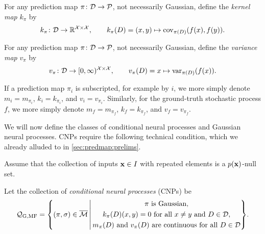 \documentclass[12pt, twoside]{report}
\begin{document}
\begin{definition}
    \label{def:kernel_map}
    For any prediction map $\pi \colon \mathcal{D} \to \mathcal{P}$, not necessarily Gaussian, define the \emph{kernel map} $k_\pi$ by
    \begin{equation}
        k_\pi\colon \mathcal{D} \to \mathbb{R}^{\mathcal{X} \times \mathcal{X}}, \qquad
        k_\pi(D) = (x, y) \mapsto \operatorname{cov}_{\pi(D)}(f(x), f(y)).
    \end{equation}
\end{definition}

\begin{definition}
    \label{def:variance_map}
    For any prediction map $\pi \colon \mathcal{D} \to \mathcal{P}$, not necessarily Gaussian, define the \emph{variance map} $v_\pi$ by
    \begin{equation}
        v_\pi\colon \mathcal{D} \to [0,\infty)^{\mathcal{X} \times \mathcal{X}}, \qquad
        v_\pi(D) = x \mapsto \operatorname{var}_{\pi(D)}(f(x)).
    \end{equation}
\end{definition}

If a prediction map $\pi_i$ is subscripted, for example by $i$, we more simply denote $m_i = m_{\pi_i}$, $k_i = k_{\pi_i}$, and $v_i = v_{\pi_i}$.
Similarly, for the ground-truth stochastic process $f$, we more simply denote $m_f = m_{\pi_f}$, $k_f = k_{\pi_f}$, and $v_f = v_{\pi_f}$.


We will now define the classes of conditional neural processes and Gaussian neural processes.
CNPs require the following technical condition, which we already alluded to in \cref{sec:predmap:prelims}.

\begin{assumption} \label{assum:repeated_elements_is_null_set}
    Assume that the collection of inputs $\mathbf{x} \in I$ with repeated elements is a $p(\mathbf{x})$-null set.
\end{assumption}


\begin{definition}
    \label{def:cnp}
    Let the collection of \emph{conditional neural processes} (CNPs) be
    \begin{equation}
        \Qc\ss{G,MF} = \set*{(\pi, \sigma) \in \overline{\M}
            \middlecond
            \begin{gathered}
                \text{\normalshape $\pi$ is Gaussian}, \\
                \text{\normalshape $k_\pi(D)(x, y) = 0$ for all $x \neq y$ and $D \in \D$}, \\
                \text{\normalshape $m_\pi(D)$ and $v_\pi(D)$ are continuous for all $D \in \D$} \\
            \end{gathered}
        }.
    \end{equation}
\end{definition}
\end{document}
